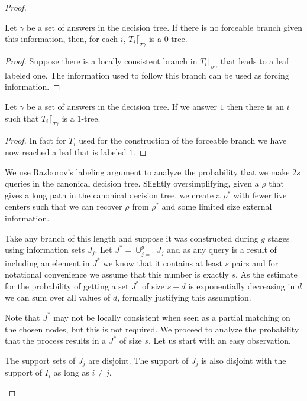 \documentclass{theoretics}
\begin{document}
\begin{proof}
\begin{lemma}
Let $\gamma$ be a set of answers in the decision
tree.  If there is no forceable branch given this
information, then, for each $i$,
$T_i \lceil_{\sigma \gamma}$ is a $0$-tree.
\end{lemma}

\begin{proof}
Suppose there is a locally consistent branch in $T_i \lceil_{\sigma \gamma}$ 
that leads to a leaf labeled one.  
The information
used to follow this branch can be used as forcing
information.
\end{proof}

\begin{lemma}
Let $\gamma$ be a set of answers in the decision
tree.  If we answer $1$ then there is an $i$ such that
$T_i \lceil_{\sigma \gamma}$ is a $1$-tree.
\end{lemma}

\begin{proof}
In fact for $T_i$ used for the construction of 
the forceable branch we have now reached a leaf that is labeled $1$.
\end{proof}

We use Razborov's labeling argument \cite{Razborov1995}
to analyze the probability that we make $2s$ queries in the 
canonical decision tree.  Slightly oversimplifying, given
a $\rho$ that gives a long path in the canonical decision
tree, we create a $\rho^*$ with fewer live centers such
that we can recover $\rho$ from $\rho^*$ and some
limited size external information.

Take any branch of this length
and suppose it was constructed during $g$ stages
using information sets $J_j$.  
Let $J^*=\cup_{j=1}^g J_j$ and as any query is a result of including
an element in $J^*$ we know that it contains 
at least $s$ pairs and for notational
convenience we assume that this number is exactly $s$.
As the estimate for the probability of getting a set $J^*$
of size $s+d$ is exponentially decreasing in $d$ we can
sum over all values of $d$, formally justifying this assumption.

Note that $J^*$ may not be locally consistent when seen as
a partial matching on the chosen nodes, but this is not required.
We proceed to analyze the probability that the process
results in a $J^*$ of size $s$.  Let us start with
an easy observation.

\begin{lemma}\label{lemma:disjoint}
The support sets of $J_j$ are disjoint.  The support of
$J_j$ is also disjoint with the support of $I_i$ as
long as $i\not= j$.
\end{lemma}


\end{proof}
\end{document}
